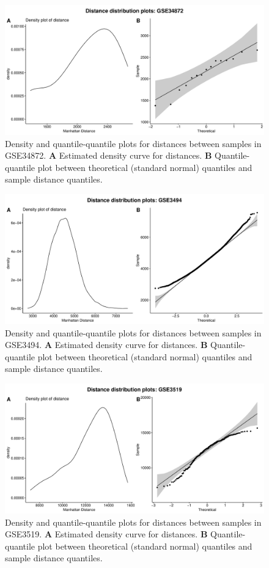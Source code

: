 \documentclass[10pt,letterpaper]{article}\usepackage[]{graphicx}\usepackage[]{color}
\begin{document}
\begin{figure}[H]
	\includegraphics[width=\textwidth]{manhattan-distance_hist_GSE34872.pdf}
	\caption{Density and quantile-quantile plots for distances between samples in GSE34872. \textbf{A} Estimated density curve for distances. \textbf{B} Quantile-quantile plot between theoretical (standard normal) quantiles and sample distance quantiles.}
\end{figure}

\begin{figure}[H]
	\includegraphics[width=\textwidth]{manhattan-distance_hist_GSE3494.pdf}
	\caption{Density and quantile-quantile plots for distances between samples in GSE3494. \textbf{A} Estimated density curve for distances. \textbf{B} Quantile-quantile plot between theoretical (standard normal) quantiles and sample distance quantiles.}
\end{figure}

\begin{figure}[H]
	\includegraphics[width=\textwidth]{manhattan-distance_hist_GSE3519.pdf}
	\caption{Density and quantile-quantile plots for distances between samples in GSE3519. \textbf{A} Estimated density curve for distances. \textbf{B} Quantile-quantile plot between theoretical (standard normal) quantiles and sample distance quantiles.}
\end{figure}
\end{document}
